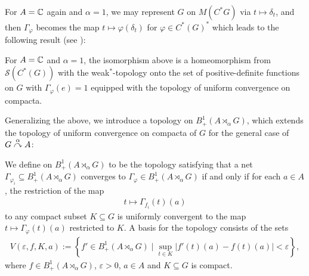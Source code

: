 For $A = \mathbb{C}$ again and $\alpha = 1$, we may represent $G$ on $M(C^*G)$ via $t \mapsto \delta_t$, and then $\Gamma_\varphi$ becomes the map $t \mapsto \varphi(\delta_t)$ for $ \varphi \in C^*(G)^*$ which leads to the following result (see \cite[7.1.11]{pedersenalgauto}):
\begin{proposition}
	For $A= \mathbb{C}$ and $\alpha = 1$, the isomorphism above is a homeomorphism from $\mathcal{S}(C^*(G))$ with the weak$^*$-topology onto the set of positive-definite functions on $G$ with $\Gamma_\varphi(e)=1$ equipped with the topology of uniform convergence on compacta.
	\label{mult:OGstatehomeo}
\end{proposition}

Generalizing the above, we introduce a topology on $B_+^1(A \rtimes_\alpha G)$, which extends the topology of uniform convergence on compacta of $G$ for the general case of $G \stackrel{\alpha}{\curvearrowright} A$:
\begin{definition}
	We define  on $B_+^1(A \rtimes_\alpha G)$ to be the topology satisfying that a net $\Gamma_{\varphi_i} \subseteq B_+^1(A \rtimes_\alpha G)$ converges to $\Gamma_{\varphi} \in B_+^1(A \rtimes_\alpha G)$ if and only if for each $a \in A$, the restriction of the map
	\begin{align*}
		t \mapsto \Gamma_{f_i}(t)(a)
	\end{align*}
	to any compact subset $K \subseteq G$ is uniformly convergent to the map $t \mapsto \Gamma_\varphi(t)(a)$ restricted to $K$. A basis for the topology consists of the sets
	\begin{align*}
		V(\varepsilon, f, K, a) :=\left\{ f' \in B_+^1(A \rtimes_\alpha G) \mid \sup_{t \in K}| f'(t)(a) - f(t)(a) | < \varepsilon \right\},
	\end{align*}
	where $f \in B_{+}^1(A \rtimes_\alpha G)$, $\varepsilon > 0$, $a \in A$ and $K \subseteq G$ is compact.
\end{definition}

